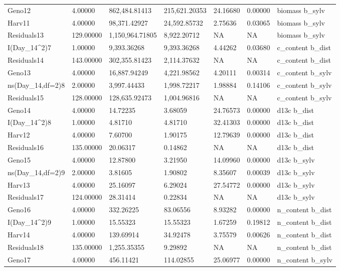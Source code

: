 \documentclass[jou,floatsintext]{apa6}
\begin{document}
\begin{table}[tbp]
\begin{center}
\begin{threeparttable}
{\begin{tabular}{lllllll}
Geno12 & 4.00000 & 862,484.81413 & 215,621.20353 & 24.16680 & 0.00000 & biomass b\_sylv\\
Harv11 & 4.00000 & 98,371.42927 & 24,592.85732 & 2.75636 & 0.03065 & biomass b\_sylv\\
Residuals13 & 129.00000 & 1,150,964.71805 & 8,922.20712 & NA & NA & biomass b\_sylv\\
I(Day\_14\textasciicircum{}2)7 & 1.00000 & 9,393.36268 & 9,393.36268 & 4.44262 & 0.03680 & c\_content b\_dist\\
Residuals14 & 143.00000 & 302,355.81423 & 2,114.37632 & NA & NA & c\_content b\_dist\\
Geno13 & 4.00000 & 16,887.94249 & 4,221.98562 & 4.20111 & 0.00314 & c\_content b\_sylv\\
ns(Day\_14,df=2)8 & 2.00000 & 3,997.44433 & 1,998.72217 & 1.98884 & 0.14106 & c\_content b\_sylv\\
Residuals15 & 128.00000 & 128,635.92473 & 1,004.96816 & NA & NA & c\_content b\_sylv\\
Geno14 & 4.00000 & 14.72235 & 3.68059 & 24.76573 & 0.00000 & d13c b\_dist\\
I(Day\_14\textasciicircum{}2)8 & 1.00000 & 4.81710 & 4.81710 & 32.41303 & 0.00000 & d13c b\_dist\\
Harv12 & 4.00000 & 7.60700 & 1.90175 & 12.79639 & 0.00000 & d13c b\_dist\\
Residuals16 & 135.00000 & 20.06317 & 0.14862 & NA & NA & d13c b\_dist\\
Geno15 & 4.00000 & 12.87800 & 3.21950 & 14.09960 & 0.00000 & d13c b\_sylv\\
ns(Day\_14,df=2)9 & 2.00000 & 3.81605 & 1.90802 & 8.35607 & 0.00039 & d13c b\_sylv\\
Harv13 & 4.00000 & 25.16097 & 6.29024 & 27.54772 & 0.00000 & d13c b\_sylv\\
Residuals17 & 124.00000 & 28.31414 & 0.22834 & NA & NA & d13c b\_sylv\\
Geno16 & 4.00000 & 332.26225 & 83.06556 & 8.93282 & 0.00000 & n\_content b\_dist\\
I(Day\_14\textasciicircum{}2)9 & 1.00000 & 15.55323 & 15.55323 & 1.67259 & 0.19812 & n\_content b\_dist\\
Harv14 & 4.00000 & 139.69914 & 34.92478 & 3.75579 & 0.00626 & n\_content b\_dist\\
Residuals18 & 135.00000 & 1,255.35355 & 9.29892 & NA & NA & n\_content b\_dist\\
Geno17 & 4.00000 & 456.11421 & 114.02855 & 25.06977 & 0.00000 & n\_content b\_sylv\\

\end{tabular}}
\end{threeparttable}
\end{center}
\end{table}
\end{document}
